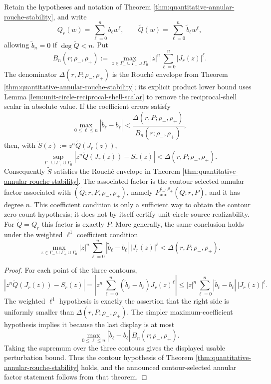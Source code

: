 \begin{corollary}\label{cor:coefficient-annular-stability}
Retain the hypotheses and notation of Theorem \ref{thm:quantitative-annular-rouche-stability}, and write
\[
Q_r(w)=\sum_{\ell=0}^{n}b_\ell w^\ell,
\qquad
\widetilde Q(w)=\sum_{\ell=0}^{n}\widetilde b_\ell w^\ell,
\]
allowing \(\widetilde b_n=0\) if \(\deg\widetilde Q<n\).  Put
\[
B_n(r;\rho_-,\rho_+)
:=
\max_{z\in\Gamma_-\cup\Gamma_+\cup\Gamma_0}
|z|^n\sum_{\ell=0}^{n}|J_r(z)|^\ell.
\]
The denominator \(\Delta(r,P;\rho_-,\rho_+)\) is the Rouch\'e envelope
from Theorem \ref{thm:quantitative-annular-rouche-stability}; its
explicit product lower bound uses Lemma
\ref{lem:unit-circle-reciprocal-shell-scalar} to remove the
reciprocal-shell scalar in absolute value.
If the coefficient errors satisfy
\[
\max_{0\le \ell\le n}|\widetilde b_\ell-b_\ell|
<
\frac{\Delta(r,P;\rho_-,\rho_+)}{B_n(r;\rho_-,\rho_+)},
\]
then, with \(\widetilde S(z):=z^n\widetilde Q(J_r(z))\),
\[
\sup_{\Gamma_-\cup\Gamma_+\cup\Gamma_0}
\left|z^n\widetilde Q(J_r(z))-S_r(z)\right|
<\Delta(r,P;\rho_-,\rho_+).
\]
Consequently \(\widetilde S\) satisfies the Rouch\'e envelope in Theorem
\ref{thm:quantitative-annular-rouche-stability}.  The associated
factor is the contour-selected annular factor associated with
\((\widetilde Q;r,P,\rho_-,\rho_+)\), namely
\(P_{\mathrm{ann}}^{\rho_-,\rho_+}(\widetilde Q;r,P)\), and it has
degree \(n\).  This coefficient condition is only a sufficient way to
obtain the contour zero-count hypothesis; it does not by itself certify
unit-circle source realizability.  For \(\widetilde Q=Q_r\) this factor is
exactly \(P\).
More generally, the same conclusion holds under the weighted \(\ell^1\)
coefficient condition
\[
\max_{z\in\Gamma_-\cup\Gamma_+\cup\Gamma_0}
|z|^n\sum_{\ell=0}^{n}|\widetilde b_\ell-b_\ell|\,|J_r(z)|^\ell
<\Delta(r,P;\rho_-,\rho_+).
\]
\end{corollary}

\begin{proof}
For each point of the three contours,
\[
\left|z^n\widetilde Q(J_r(z))-S_r(z)\right|
=
\left|z^n\sum_{\ell=0}^{n}(\widetilde b_\ell-b_\ell)J_r(z)^\ell\right|
\le
|z|^n\sum_{\ell=0}^{n}|\widetilde b_\ell-b_\ell|\,|J_r(z)|^\ell.
\]
The weighted \(\ell^1\) hypothesis is exactly the assertion that the right side is uniformly smaller than \(\Delta(r,P;\rho_-,\rho_+)\).  The simpler maximum-coefficient hypothesis implies it because the last display is at most
\[
\max_{0\le \ell\le n}|\widetilde b_\ell-b_\ell|\,
B_n(r;\rho_-,\rho_+).
\]
Taking the supremum over the three contours gives the displayed usable
perturbation bound.  Thus the contour hypothesis of Theorem
\ref{thm:quantitative-annular-rouche-stability} holds, and the announced
contour-selected annular factor statement follows from that theorem.
\end{proof}
